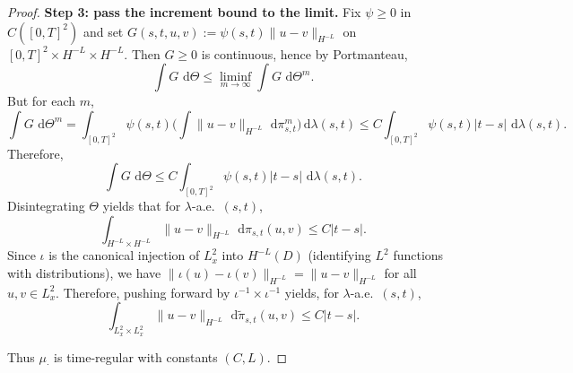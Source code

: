 \documentclass[10pt,a4paper]{amsart}
\newcommand{\dd}{\,\mathrm{d}}
\begin{document}
\begin{proof}
\smallskip
\noindent\textbf{Step 3: pass the increment bound to the limit.}
Fix $\psi\ge0$ in $C([0,T]^2)$ and set $G(s,t,u,v):=\psi(s,t)\|u-v\|_{H^{-L}}$ on $[0,T]^2\times H^{-L}\times H^{-L}$.
Then $G\ge0$ is continuous, hence by Portmanteau,
\[
\int G\,\dd\Theta
\le \liminf_{m\to\infty}\int G\,\dd\Theta^m.
\]
But for each $m$,
\[
\int G\,\dd\Theta^m
=
\int_{[0,T]^2}\psi(s,t)\Big(\int\|u-v\|_{H^{-L}}\,\dd\pi^m_{s,t}\Big)\dd\lambda(s,t)
\le C\int_{[0,T]^2}\psi(s,t)|t-s|\,\dd\lambda(s,t).
\]
Therefore,
\[
\int G\,\dd\Theta
\le C\int_{[0,T]^2}\psi(s,t)|t-s|\,\dd\lambda(s,t).
\]
Disintegrating $\Theta$ yields that for $\lambda$-a.e.\ $(s,t)$,
\[
\int_{H^{-L}\times H^{-L}}\|u-v\|_{H^{-L}}\,\dd\pi_{s,t}(u,v)\le C|t-s|.
\]
Since $\iota$ is the canonical injection of $L^2_x$ into $H^{-L}(D)$ (identifying $L^2$ functions with distributions),
we have $\|\iota(u)-\iota(v)\|_{H^{-L}}=\|u-v\|_{H^{-L}}$ for all $u,v\in L^2_x$. Therefore, pushing forward by $\iota^{-1}\times\iota^{-1}$ yields, for $\lambda$-a.e.\ $(s,t)$,
\[
\int_{L^2_x\times L^2_x}\|u-v\|_{H^{-L}}\,\dd\widetilde\pi_{s,t}(u,v)\le C|t-s|.
\]

Thus $\mu_\cdot$ is time-regular with constants $(C,L)$.
\end{proof}
\end{document}

